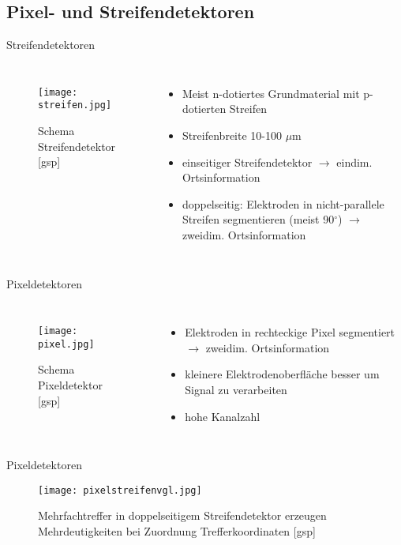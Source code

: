 \subsection[]{Pixel- und Streifendetektoren}


\begin{frame}{Streifendetektoren}
	\begin{columns}[T]
			\begin{figure}[htbp]
			  \centering
			  \texttt{[image: streifen.jpg]}
			  \caption{Schema Streifendetektor [gsp]}
			\end{figure}
	    	\begin{itemize}
			  \item Meist n-dotiertes Grundmaterial mit p-dotierten Streifen
			  \item Streifenbreite 10-100 $\mu$m
			  \item einseitiger Streifendetektor $\rightarrow$ eindim. Ortsinformation
			  \item doppelseitig: Elektroden in nicht-parallele Streifen segmentieren (meist 90$^\circ$)
			  $\rightarrow$ zweidim. Ortsinformation
			\end{itemize}
    \end{columns}
\end{frame}


\begin{frame}{Pixeldetektoren}
	\begin{columns}[T]
			\begin{figure}[htbp]
			  \centering
			  \texttt{[image: pixel.jpg]}
			  \caption{Schema Pixeldetektor [gsp]}
			\end{figure}	
	    	\begin{itemize}
			  \item Elektroden in rechteckige Pixel segmentiert $\rightarrow$ zweidim. Ortsinformation
			  \item kleinere Elektrodenoberfläche besser um Signal zu verarbeiten 
			  \item hohe Kanalzahl
			\end{itemize}
    \end{columns}
\end{frame}


\begin{frame}{Pixeldetektoren}
			\begin{figure}[htbp]
			  \centering
			  \texttt{[image: pixelstreifenvgl.jpg]}
			  \caption{Mehrfachtreffer in doppelseitigem Streifendetektor erzeugen Mehrdeutigkeiten bei Zuordnung
			Trefferkoordinaten [gsp]}
			\end{figure}	
\end{frame}



